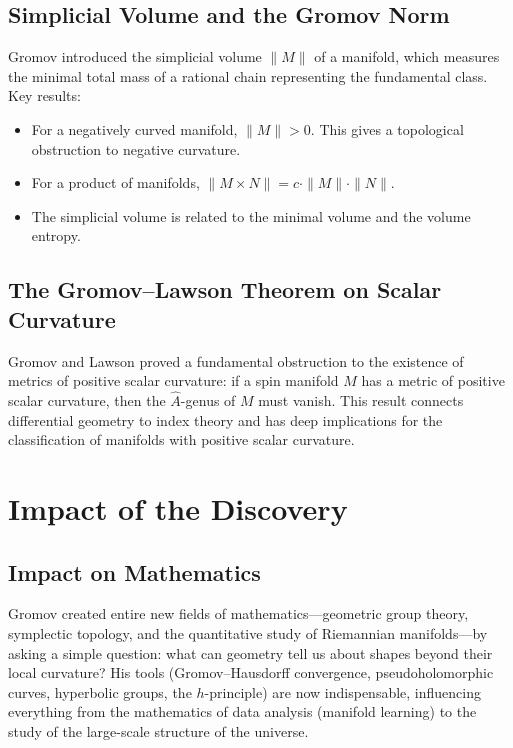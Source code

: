 \subsection{Simplicial Volume and the Gromov Norm}

Gromov introduced the simplicial volume $\|M\|$ of a manifold, which measures the minimal total mass of a rational chain representing the fundamental class. Key results:
\begin{itemize}
\item For a negatively curved manifold, $\|M\| > 0$. This gives a topological obstruction to negative curvature.
\item For a product of manifolds, $\|M \times N\| = c \cdot \|M\| \cdot \|N\|$.
\item The simplicial volume is related to the minimal volume and the volume entropy.
\end{itemize}

\subsection{The Gromov--Lawson Theorem on Scalar Curvature}

Gromov and Lawson proved a fundamental obstruction to the existence of metrics of positive scalar curvature: if a spin manifold $M$ has a metric of positive scalar curvature, then the $\widehat{A}$-genus of $M$ must vanish. This result connects differential geometry to index theory and has deep implications for the classification of manifolds with positive scalar curvature.

\section{Impact of the Discovery}

\subsection{Impact on Mathematics}

\begin{whyitmatters}
Gromov created entire new fields of mathematics---geometric group theory, symplectic topology, and the quantitative study of Riemannian manifolds---by asking a simple question: what can geometry tell us about shapes beyond their local curvature? His tools (Gromov--Hausdorff convergence, pseudoholomorphic curves, hyperbolic groups, the $h$-principle) are now indispensable, influencing everything from the mathematics of data analysis (manifold learning) to the study of the large-scale structure of the universe.
\end{whyitmatters}

